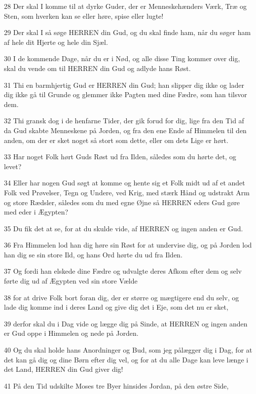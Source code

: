 \par 28 Der skal I komme til at dyrke Guder, der er Menneskehænders Værk, Træ og Sten, som hverken kan se eller høre, spise eller lugte!
\par 29 Der skal I så søge HERREN din Gud, og du skal finde ham, når du søger ham af hele dit Hjerte og hele din Sjæl.
\par 30 I de kommende Dage, når du er i Nød, og alle disse Ting kommer over dig, skal du vende om til HERREN din Gud og adlyde hans Røst.
\par 31 Thi en barmhjertig Gud er HERREN din Gud; han slipper dig ikke og lader dig ikke gå til Grunde og glemmer ikke Pagten med dine Fædre, som han tilsvor dem.
\par 32 Thi gransk dog i de henfarne Tider, der gik forud for dig, lige fra den Tid af da Gud skabte Menneskene på Jorden, og fra den ene Ende af Himmelen til den anden, om der er sket noget så stort som dette, eller om dets Lige er hørt.
\par 33 Har noget Folk hørt Guds Røst ud fra Ilden, således som du hørte det, og levet?
\par 34 Eller har nogen Gud søgt at komme og hente sig et Folk midt ud af et andet Folk ved Prøvelser, Tegn og Undere, ved Krig, med stærk Hånd og udstrakt Arm og store Rædsler, således som du med egne Øjne så HERREN eders Gud gøre med eder i Ægypten?
\par 35 Du fik det at se, for at du skulde vide, af HERREN og ingen anden er Gud.
\par 36 Fra Himmelen lod han dig høre sin Røst for at undervise dig, og på Jorden lod han dig se sin store Ild, og hans Ord hørte du ud fra Ilden.
\par 37 Og fordi han elskede dine Fædre og udvalgte deres Afkom efter dem og selv førte dig ud af Ægypten ved sin store Vælde
\par 38 for at drive Folk bort foran dig, der er større og mægtigere end du selv, og lade dig komme ind i deres Land og give dig det i Eje, som det nu er sket,
\par 39 derfor skal du i Dag vide og lægge dig på Sinde, at HERREN og ingen anden er Gud oppe i Himmelen og nede på Jorden.
\par 40 Og du skal holde hans Anordninger og Bud, som jeg pålægger dig i Dag, for at det kan gå dig og dine Børn efter dig vel, og for at du alle Dage kan leve længe i det Land, HERREN din Gud giver dig!
\par 41 På den Tid udskilte Moses tre Byer hinsides Jordan, på den østre Side,
